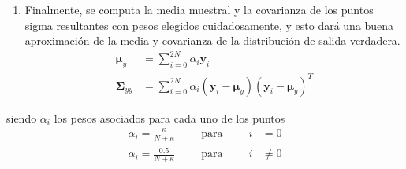 \begin{enumerate}
    \item Finalmente, se computa la media muestral y la covarianza de los puntos sigma resultantes con pesos elegidos cuidadosamente, y esto dará una buena aproximación de la media y covarianza de la distribución de salida verdadera.
    \begin{align}
        \bm{\mu}_y &= \sum_{i=0}^{2N}\alpha_i\bm{y}_i \\
        \bm{\Sigma}_{yy} &= \sum_{i=0}^{2N}\alpha_i(\bm{y}_i-\bm{\mu}_y)(\bm{y}_i-\bm{\mu}_y)^T
    \end{align}
\end{enumerate}
siendo $\alpha_i$ los pesos asociados para cada uno de los puntos
\begin{align}
    \alpha_i = \frac{\kappa}{N+\kappa}\hspace{1cm}\text{para}\hspace{1cm}i &= 0 \\
    \alpha_i = \frac{0.5}{N+\kappa}\hspace{1cm}\text{para}\hspace{1cm}i &\neq 0
\end{align}

